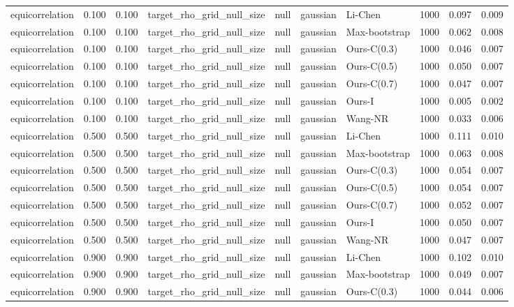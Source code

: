 \begin{tabular}{lrrllllrrr}
equicorrelation & 0.100 & 0.100 & target\_rho\_grid\_null\_size & null & gaussian & Li-Chen & 1000 & 0.097 & 0.009 \\
equicorrelation & 0.100 & 0.100 & target\_rho\_grid\_null\_size & null & gaussian & Max-bootstrap & 1000 & 0.062 & 0.008 \\
equicorrelation & 0.100 & 0.100 & target\_rho\_grid\_null\_size & null & gaussian & Ours-C(0.3) & 1000 & 0.046 & 0.007 \\
equicorrelation & 0.100 & 0.100 & target\_rho\_grid\_null\_size & null & gaussian & Ours-C(0.5) & 1000 & 0.050 & 0.007 \\
equicorrelation & 0.100 & 0.100 & target\_rho\_grid\_null\_size & null & gaussian & Ours-C(0.7) & 1000 & 0.047 & 0.007 \\
equicorrelation & 0.100 & 0.100 & target\_rho\_grid\_null\_size & null & gaussian & Ours-I & 1000 & 0.005 & 0.002 \\
equicorrelation & 0.100 & 0.100 & target\_rho\_grid\_null\_size & null & gaussian & Wang-NR & 1000 & 0.033 & 0.006 \\
equicorrelation & 0.500 & 0.500 & target\_rho\_grid\_null\_size & null & gaussian & Li-Chen & 1000 & 0.111 & 0.010 \\
equicorrelation & 0.500 & 0.500 & target\_rho\_grid\_null\_size & null & gaussian & Max-bootstrap & 1000 & 0.063 & 0.008 \\
equicorrelation & 0.500 & 0.500 & target\_rho\_grid\_null\_size & null & gaussian & Ours-C(0.3) & 1000 & 0.054 & 0.007 \\
equicorrelation & 0.500 & 0.500 & target\_rho\_grid\_null\_size & null & gaussian & Ours-C(0.5) & 1000 & 0.054 & 0.007 \\
equicorrelation & 0.500 & 0.500 & target\_rho\_grid\_null\_size & null & gaussian & Ours-C(0.7) & 1000 & 0.052 & 0.007 \\
equicorrelation & 0.500 & 0.500 & target\_rho\_grid\_null\_size & null & gaussian & Ours-I & 1000 & 0.050 & 0.007 \\
equicorrelation & 0.500 & 0.500 & target\_rho\_grid\_null\_size & null & gaussian & Wang-NR & 1000 & 0.047 & 0.007 \\
equicorrelation & 0.900 & 0.900 & target\_rho\_grid\_null\_size & null & gaussian & Li-Chen & 1000 & 0.102 & 0.010 \\
equicorrelation & 0.900 & 0.900 & target\_rho\_grid\_null\_size & null & gaussian & Max-bootstrap & 1000 & 0.049 & 0.007 \\
equicorrelation & 0.900 & 0.900 & target\_rho\_grid\_null\_size & null & gaussian & Ours-C(0.3) & 1000 & 0.044 & 0.006 \\

\end{tabular}
